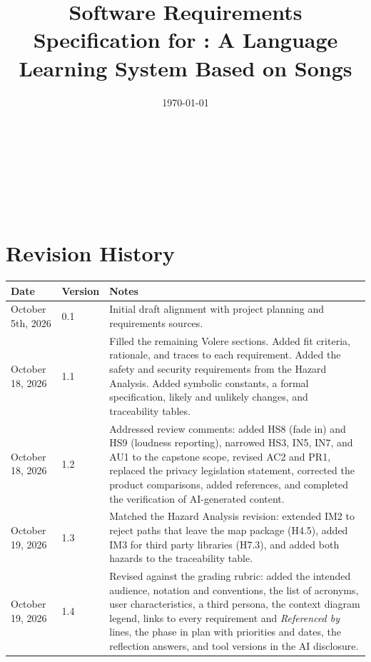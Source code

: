 \documentclass[12pt]{article}
\begin{document}
\title{Software Requirements Specification for \progname: A Language Learning System Based on Songs}
\author{\authname}
\date{\today}

\maketitle

~\newpage


\tableofcontents

~\newpage

\listoftables

\listoffigures

~\newpage

\section*{Revision History}

\begin{tabularx}{\textwidth}{p{3cm}p{2cm}X}
\toprule {\textbf{Date}} & {\textbf{Version}} & {\textbf{Notes}}\\
\midrule
October 5th, 2026 & 0.1 & Initial draft alignment with project planning and requirements sources.\\
October 18, 2026 & 1.1 & Filled the remaining Volere sections. Added fit
criteria, rationale, and traces to each requirement. Added the safety and
security requirements from the Hazard Analysis. Added symbolic constants, a
formal specification, likely and unlikely changes, and traceability tables.\\
October 18, 2026 & 1.2 & Addressed review comments: added HS8 (fade in) and
HS9 (loudness reporting), narrowed HS3, IN5, IN7, and AU1 to the capstone
scope, revised AC2 and PR1, replaced the privacy legislation statement,
corrected the product comparisons, added references, and completed the
verification of AI-generated content.\\
October 19, 2026 & 1.3 & Matched the Hazard Analysis revision: extended IM2
to reject paths that leave the map package (H4.5), added IM3 for third party
libraries (H7.3), and added both hazards to the traceability table.\\
October 19, 2026 & 1.4 & Revised against the grading rubric: added the
intended audience, notation and conventions, the list of acronyms, user
characteristics, a third persona, the context diagram legend, links to every
requirement and \emph{Referenced by} lines, the phase in plan with priorities
and dates, the reflection answers, and tool versions in the AI disclosure.\\
\bottomrule
\end{tabularx}
\end{document}
